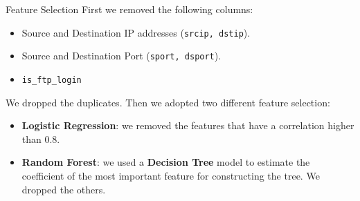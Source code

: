 \documentclass[12pt,aspectratio=169,notheorems]{beamer}
\begin{document}
\begin{frame}{Feature Selection}
    First we removed the following columns:
    \begin{itemize}
        \item Source and Destination IP addresses (\texttt{srcip, dstip}).
        \item Source and Destination Port (\texttt{sport, dsport}).
        \item \texttt{is\_ftp\_login}
    \end{itemize}
    We dropped the duplicates. Then we adopted two different feature selection:
    \begin{itemize}
        \item \textbf{Logistic Regression}: we removed the features that have a correlation higher than 0.8.
        \item \textbf{Random Forest}: we used a \textbf{Decision Tree} model to estimate the coefficient of the most important feature for constructing the tree. We dropped the others.  
    \end{itemize}
\end{frame}
\end{document}
